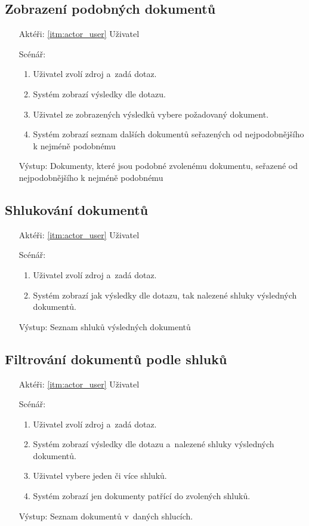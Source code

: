 \subsection{Zobrazení podobných dokumentů}
\begin{itemize}
	\item[Aktéři:] \ref{itm:actor_user} Uživatel
	\item[Scénář:]
	\begin{enumerate}
		\item Uživatel zvolí zdroj a~zadá dotaz.
		\item Systém zobrazí výsledky dle dotazu.
		\item Uživatel ze zobrazených výsledků vybere požadovaný dokument.
		\item Systém zobrazí seznam dalších dokumentů seřazených od nejpodobnějšího k nejméně podobnému
	\end{enumerate}
	\item[Výstup:] Dokumenty, které jsou podobné zvolenému dokumentu, seřazené od nejpodobnějšího k nejméně podobnému
\end{itemize}

\subsection{Shlukování dokumentů}
\begin{itemize}
	\item[Aktéři:] \ref{itm:actor_user} Uživatel
	\item[Scénář:]
	\begin{enumerate}
		\item Uživatel zvolí zdroj a~zadá dotaz.
		\item Systém zobrazí jak výsledky dle dotazu, tak nalezené shluky výsledných dokumentů.
	\end{enumerate}
	\item[Výstup:] Seznam shluků výsledných dokumentů
\end{itemize}

\subsection{Filtrování dokumentů podle shluků}
\begin{itemize}
	\item[Aktéři:] \ref{itm:actor_user} Uživatel
	\item[Scénář:]
	\begin{enumerate}
		\item Uživatel zvolí zdroj a~zadá dotaz.
		\item Systém zobrazí výsledky dle dotazu a~nalezené shluky výsledných dokumentů.
		\item Uživatel vybere jeden či více shluků.
		\item Systém zobrazí jen dokumenty patřící do zvolených shluků.
	\end{enumerate}
	\item[Výstup:] Seznam dokumentů v~daných shlucích.
\end{itemize}

